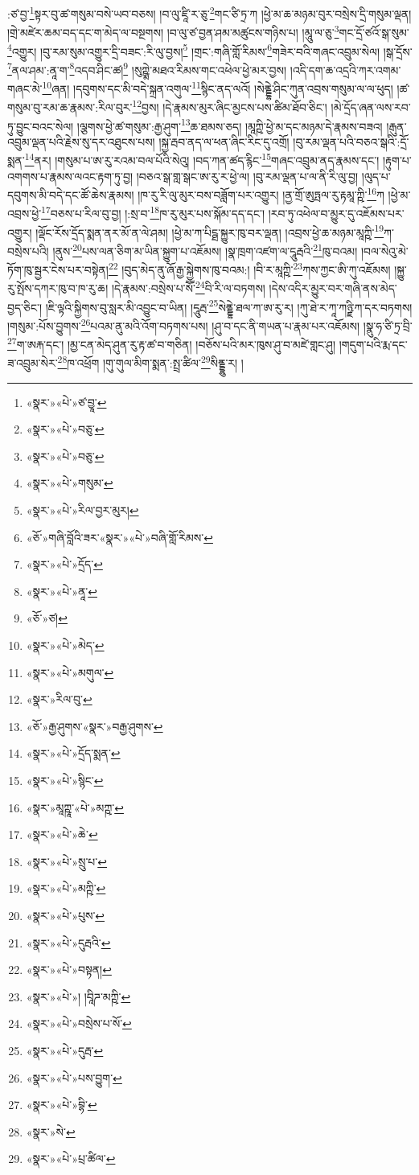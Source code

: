 :ཙ་བྱ་\footnote{«སྣར་»«པེ་»ཙ་བྱཱ་}སྟར་བུ་ཚ་གསུམ་བསེ་ཡབ་བཅས། །བ་ལུ་ཛཱི་ར་ཅུ་\footnote{«སྣར་»«པེ་»བཅུ་}གང་ཙི་ཏྲ་ཀ །ཕྱེ་མ་ཆ་མཉམ་བུར་བསྲེས་དྲི་གསུམ་ལྡན། །གྲེ་མཛེར་ཆམ་བད་དང་ག་མེད་ལ་བསྔགས། །བ་ལུ་ཙ་བྱན་ཤམ་མཚུངས་གཉིས་པ། །མཱུ་ལ་ཅུ་\footnote{«སྣར་»«པེ་»བཅུ་}གང་དྲོ་ཙའོ་སྒ་སུམ་\footnote{«སྣར་»«པེ་»གསུམ་}འགྱུར། །བུ་རམ་སུམ་འགྱུར་དྲི་བཟང་:རི་ལུ་བྱས།\footnote{«སྣར་»«པེ་»རིལ་བྱར་མུར།} །གྲང་:གཞི་གློ་རིམས་\footnote{«ཅོ་»གཞི་བློའི་ཟར་«སྣར་»«པེ་»བཞི་གློ་རིམས་}གཟེར་བའི་གཞང་འབྲུམ་སེལ། །སྒ་དྲོས་\footnote{«སྣར་»«པེ་»དྲོད་}ནལ་ཤམ་:ནཱ་ག་\footnote{«སྣར་»«པེ་»ནཱ་}འདབ་ཤིང་ཚ།\footnote{«ཅོ་»ཙ།} །སུཀྵྨེ་མཐའ་རིམས་གང་འཕེལ་ཕྱེ་མར་བྱས། །འདི་དག་ཆ་འདྲའི་ཀར་འགམ་གཞང་མེ་\footnote{«སྣར་»«པེ་»མེད་}ཞན། །དབུགས་དང་མི་བདེ་སྐྲན་འགུལ་\footnote{«སྣར་»«པེ་»མགུལ་}སྙིང་ནད་ལའོ། །སེནྡྷེ་ཤིང་ཀུན་འབྲས་གསུམ་ལ་ལ་ཕུད། །ཚ་གསུམ་བུ་རམ་ཆ་རྣམས་:རིལ་བུར་\footnote{«སྣར་»རིལ་བུ་}བྱས། །དེ་རྣམས་མུར་ཞིང་མྱངས་པས་ཚིམ་ཐོབ་ཅིང་། །མེ་དྲོད་ཞན་ལས་རབ་ཏུ་བྱུང་བའང་སེལ། །ལྕགས་ཕྱེ་ཚ་གསུམ་:རྒྱ་ཤུག་\footnote{«ཅོ་»རྒྱ་ཤུགས་«སྣར་»བརྒྱ་ཤུགས་}ཆ་ཐམས་ཅད། །མཱཀྵི་ཕྱེ་མ་དང་མཉམ་དེ་རྣམས་བཟའ། །རྒུན་འབྲུམ་ལྡན་པའི་རྗེས་སུ་དར་འཐུངས་པས། །སྐྱ་རྦབ་ནད་ལ་ཕན་ཞིང་རིང་དུ་འགྲོ། །བུ་རམ་ལྡན་པའི་བཅའ་སྒའི་:དྲོ་སྨན་\footnote{«སྣར་»«པེ་»དྲོད་སྨན་}ནར། །གསུམ་པ་ཨ་རུ་རའམ་བལ་པོའི་སེའུ། །བད་ཀན་ཚད་རྙིང་\footnote{«སྣར་»«པེ་»སྙིང་}གཞང་འབྲུམ་ནད་རྣམས་དང་། །རྟུག་པ་འགགས་པ་རྣམས་ལའང་རྟག་ཏུ་བྱ། །བཅའ་སྒ་གླ་སྒང་ཨ་རུ་ར་ཕྱེ་ལ། །བུ་རམ་ལྡན་པ་ལ་ནི་རི་ལུ་བྱ། །ལུད་པ་དབུགས་མི་བདེ་དང་ཚོ་ཆེས་རྣམས། །ཁ་རུ་རི་ལུ་མུར་བས་བཟློག་པར་འགྱུར། །ནྱ་གྲོ་ཨུཏྤལ་རུ་རྟམཱ་ཀྵི་\footnote{«སྣར་»མཱཀྵཱ་«པེ་»མཀྵ་}ཀ །ཕྱེ་མ་འབྲས་ཕྱེ་\footnote{«སྣར་»«པེ་»ཆེ་}བཅས་པ་རིལ་བུ་བྱ། །:སྲ་བ་\footnote{«སྣར་»«པེ་»སྲུ་པ་}ཁ་རུ་མུར་པས་སྐོམ་དད་དང་། །རབ་ཏུ་འཕེལ་བ་མྱུར་དུ་འཇོམས་པར་འགྱུར། །ལྡོང་རོས་དྲོད་སྨན་ནར་མོ་ན་ལེ་ཤམ། །ཕྱེ་མ་ཀ་པིངྠ་སྐྱུར་ཁུ་བར་ལྡན། །འབྲས་ཕྱེ་ཆ་མཉམ་མཱཀྵི་\footnote{«སྣར་»«པེ་»མཀྵི་}ཀ་བསྲེས་པའི། །ནུས་\footnote{«སྣར་»«པེ་»པུས་}པས་ལན་ཅིག་མ་ཡིན་སྐྱུག་པ་འཇོམས། །སྣ་ཁྲག་འཛག་ལ་དཱུརྦའི་\footnote{«སྣར་»«པེ་»དུརྦའི་}ཁུ་བའམ། །བལ་སེའུ་མེ་ཏོག་ཁུ་སྦྱར་ངེས་པར་བསྟེན།\footnote{«སྣར་»«པེ་»བསྟན།} །བུད་མེད་ནུ་ཞོ་རྒྱ་སྐྱེགས་ཁུ་བའམ:། །བི་ར་མཱཀྵི་\footnote{«སྣར་»«པེ་»། །བཱིཌ་མཀྵི་}ཀས་ཀྱང་ཨི་ཀུ་འཇོམས། །སྐྱུ་རུ་སྤོས་དཀར་ཁུ་བ་ཁ་རུ་ཆ། །དེ་རྣམས་:བསྲེས་པ་སཽ་\footnote{«སྣར་»«པེ་»བསྲེས་པ་སོ་}བི་རི་ལ་བཏགས། །དེས་འདིར་མྱུར་བར་གཞི་ནས་མེད་བྱད་ཅིང་། །ཇི་ལྟའི་སྐྱིགས་བུ་སླར་མི་འབྱུང་བ་ཡིན། །དཱུརྦ་\footnote{«སྣར་»«པེ་»དུརྦ་}སེནྡྷེ་ཐལ་ཀ་ཨ་རུ་ར། །ཀུ་ཐེ་ར་ཀཱ་ཀཉྫི་ཀ་དར་བཏགས། །གསུམ་:པོས་བྱུགས་\footnote{«སྣར་»«པེ་»པས་བྱུག་}པའམ་ནུ་མའི་འོག་བཏགས་པས། །ཤུ་བ་དང་ནི་གཡན་པ་རྣམ་པར་འཇོམས། །སྣུ་ཧ་ཙི་ཏྲ་བྲི་\footnote{«སྣར་»«པེ་»བྷི་}ག་ཨརྐ་དང་། །མྱ་ངན་མེད་ཤུན་རུ་རྟ་ཚ་བ་གཅིན། །བཅོས་པའི་མར་ཁུས་ཤུ་བ་མཛེ་གླང་ཤུ། །གདུག་པའི་རྨ་དང་ཟ་འབྲུམ་སེར་\footnote{«སྣར་»སེ་}ཁ་འཕྲོག །གུ་གུལ་མིག་སྨན་:སྤྲ་ཚིལ་\footnote{«སྣར་»«པེ་»པྲ་ཚིལ་}སིནྡྷུ་ར། །
